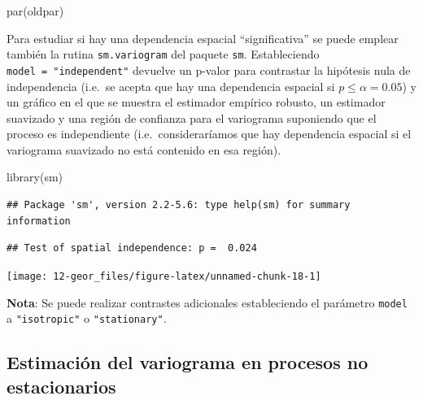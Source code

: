 \documentclass[
  spanish,
]{book}
\newenvironment{Shaded}{\begin{snugshade}}{\end{snugshade}}
\newcommand{\AttributeTok}[1]{\textcolor[rgb]{0.77,0.63,0.00}{#1}}
\newcommand{\FunctionTok}[1]{\textcolor[rgb]{0.00,0.00,0.00}{#1}}
\newcommand{\NormalTok}[1]{#1}
\newcommand{\SpecialCharTok}[1]{\textcolor[rgb]{0.00,0.00,0.00}{#1}}
\newcommand{\StringTok}[1]{\textcolor[rgb]{0.31,0.60,0.02}{#1}}
\theoremstyle{break}
\theoremstyle{definition}
\theoremstyle{definition}
\theoremstyle{definition}
\theoremstyle{definition}
\theoremstyle{remark}
\begin{document}
\begin{Shaded}
\begin{Highlighting}[]
\FunctionTok{par}\NormalTok{(oldpar)     }
\end{Highlighting}
\end{Shaded}

Para estudiar si hay una dependencia espacial ``significativa'' se puede
emplear también la rutina \texttt{sm.variogram} del paquete \texttt{sm}.
Estableciendo \texttt{model\ =\ "independent"}
devuelve un p-valor para contrastar la hipótesis nula de independencia
(i.e.~se acepta que hay una dependencia espacial si \(p \leq \alpha = 0.05\))
y un gráfico en el que se muestra el estimador empírico robusto, un estimador
suavizado y una región de confianza para el variograma suponiendo que el
proceso es independiente (i.e.~consideraríamos que hay dependencia
espacial si el variograma suavizado no está contenido en esa región).

\begin{Shaded}
\begin{Highlighting}[]
\FunctionTok{library}\NormalTok{(sm)}
\end{Highlighting}
\end{Shaded}

\begin{verbatim}
## Package 'sm', version 2.2-5.6: type help(sm) for summary information
\end{verbatim}

\begin{Shaded}
\end{Shaded}

\begin{verbatim}
## Test of spatial independence: p =  0.024
\end{verbatim}

\begin{center}\texttt{[image: 12-geor\_files/figure-latex/unnamed-chunk-18-1]} \end{center}

\textbf{Nota}: Se puede realizar contrastes adicionales estableciendo el parámetro \texttt{model}
a \texttt{"isotropic"} o \texttt{"stationary"}.

\hypertarget{estimaciuxf3n-del-variograma-en-procesos-no-estacionarios}{%
\subsection{Estimación del variograma en procesos no estacionarios}\label{estimaciuxf3n-del-variograma-en-procesos-no-estacionarios}}
\end{document}
